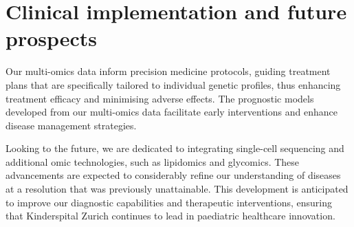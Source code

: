 \section{Clinical implementation and future prospects}

Our multi-omics data inform precision medicine protocols, guiding treatment plans that are specifically tailored to individual genetic profiles, thus enhancing treatment efficacy and minimising adverse effects. The prognostic models developed from our multi-omics data facilitate early interventions and enhance disease management strategies.

Looking to the future, we are dedicated to integrating single-cell sequencing and additional omic technologies, such as lipidomics and glycomics. These advancements are expected to considerably refine our understanding of diseases at a resolution that was previously unattainable. This development is anticipated to improve our diagnostic capabilities and therapeutic interventions, ensuring that Kinderspital Zurich continues to lead in paediatric healthcare innovation.